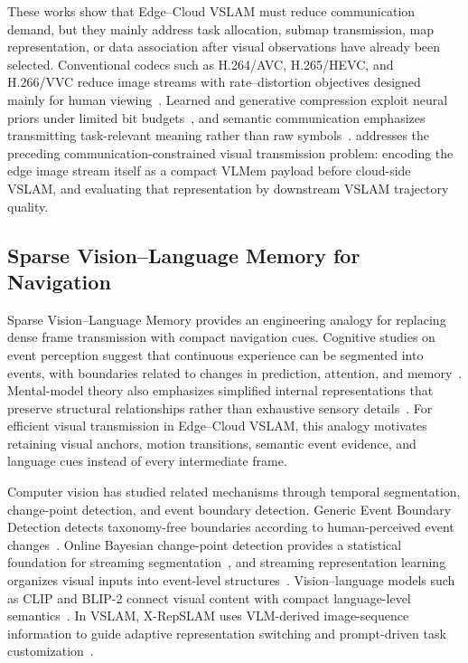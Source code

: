 These works show that Edge--Cloud VSLAM must reduce communication demand, but they mainly address task allocation, submap transmission, map representation, or data association after visual observations have already been selected. Conventional codecs such as H.264/AVC, H.265/HEVC, and H.266/VVC reduce image streams with rate--distortion objectives designed mainly for human viewing~\cite{sullivan2012h264,sullivan2012hevc,bross2021vvc}. Learned and generative compression exploit neural priors under limited bit budgets~\cite{balle2018variational,minnen2018joint,agustsson2020scale,mentzer2020highfidelity}, and semantic communication emphasizes transmitting task-relevant meaning rather than raw symbols~\cite{qin2021semantic,luo2022semantic}. \VLMemCodec{} addresses the preceding communication-constrained visual transmission problem: encoding the edge image stream itself as a compact VLMem payload before cloud-side VSLAM, and evaluating that representation by downstream VSLAM trajectory quality.

\subsection{Sparse Vision--Language Memory for Navigation}
\label{subsec:sparse_visual_memory}

Sparse Vision--Language Memory provides an engineering analogy for replacing dense frame transmission with compact navigation cues. Cognitive studies on event perception suggest that continuous experience can be segmented into events, with boundaries related to changes in prediction, attention, and memory~\cite{zacks2001event,zacks2007event}. Mental-model theory also emphasizes simplified internal representations that preserve structural relationships rather than exhaustive sensory details~\cite{johnsonlaird1983mental}. For efficient visual transmission in Edge--Cloud VSLAM, this analogy motivates retaining visual anchors, motion transitions, semantic event evidence, and language cues instead of every intermediate frame.

Computer vision has studied related mechanisms through temporal segmentation, change-point detection, and event boundary detection. Generic Event Boundary Detection detects taxonomy-free boundaries according to human-perceived event changes~\cite{shou2021gebd}. Online Bayesian change-point detection provides a statistical foundation for streaming segmentation~\cite{adams2007bayesian}, and streaming representation learning organizes visual inputs into event-level structures~\cite{streamer2023}. Vision--language models such as CLIP and BLIP-2 connect visual content with compact language-level semantics~\cite{radford2021clip,li2023blip2}. In VSLAM, X-RepSLAM uses VLM-derived image-sequence information to guide adaptive representation switching and prompt-driven task customization~\cite{chen2025xrepslam}.

